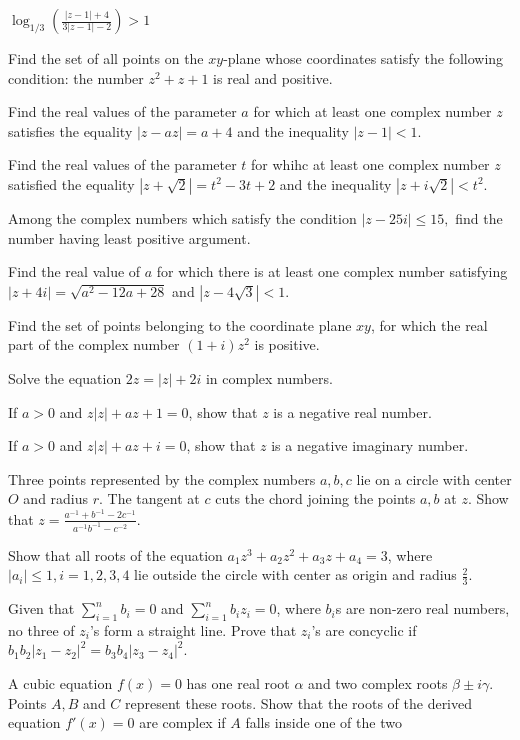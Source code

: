   $\log_{1/3}\left(\frac{|z - 1| + 4}{3|z - 1| - 2}\right) > 1$
\item Find the set of all points on the $xy$-plane whose coordinates satisfy the following condition: the number $z^2 + z + 1$ is
  real and positive.
\item Find the real values of the parameter $a$ for which at least one complex number $z$ satisfies the equality $|z - az| = a + 4$
  and the inequality $|z - 1|< 1$.
\item Find the real values of the parameter $t$ for whihc at least one complex number $z$ satisfied the equality $|z + \sqrt{2}| =
  t^2 - 3t + 2$ and the inequality $|z + i\sqrt{2}| < t^2$.
\item Among the complex numbers which satisfy the condition $|z - 25i|\leq 15,$ find the number having least positive argument.
\item Find the real value of $a$ for which there is at least one complex number satisfying $|z + 4i| = \sqrt{a^2 - 12a + 28}$ and
  $|z - 4\sqrt{3}| < 1$.
\item Find the set of points belonging to the coordinate plane $xy$, for which the real part of the complex number $(1 + i)z^2$ is
  positive.
\item Solve the equation $2z = |z| + 2i$ in complex numbers.
\item If $a > 0$ and $z|z| + az + 1 = 0$, show that $z$ is a negative real number.
\item If $a > 0$ and $z|z| + az + i = 0$, show that $z$ is a negative imaginary number.
\item Three points represented by the complex numbers $a, b, c$ lie on a circle with center $O$ and radius
  $r$. The tangent at $c$ cuts the chord joining the points $a, b$ at $z$. Show that $z = \frac{a^{-1} +
  b^{-1} - 2c^{-1}}{a^{-1}b^{-1} - c^{-2}}$.
\item Show that all roots of the equation $a_1z^3 + a_2z^2 + a_3z + a_4 = 3$, where $|a_i|\leq 1, i = 1, 2,
  3, 4$ lie outside the circle with center as origin and radius $\frac{2}{3}$.
\item Given that $\displaystyle\sum_{i = 1}^nb_i = 0$ and $\displaystyle\sum_{i=1}^nb_iz_i = 0$, where
  $b_i$s are non-zero real numbers, no three of $z_i$'s form a straight line. Prove that $z_i$'s are concyclic
  if $b_1b_2|z_1 - z_2|^2 = b_3b_4|z_3 - z_4|^2$.
\item A cubic equation $f(x) = 0$ has one real root $\alpha$ and two complex roots $\beta \pm i\gamma$. Points $A, B$ and $C$
  represent these roots. Show that the roots of the derived equation $f'(x) = 0$ are complex if $A$ falls inside one of the two
